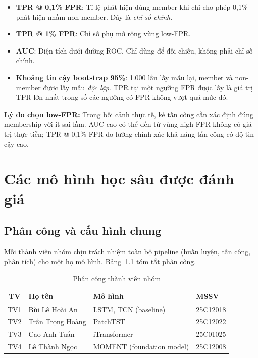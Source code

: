 \documentclass[12pt,a4paper]{report}
\begin{document}
\begin{itemize}
  \item \textbf{TPR @ 0,1\% FPR}: Tỉ lệ phát hiện đúng member khi chỉ cho phép 0,1\% phát hiện nhầm non-member. Đây là \textit{chỉ số chính}.
  \item \textbf{TPR @ 1\% FPR}: Chỉ số phụ mở rộng vùng low-FPR.
  \item \textbf{AUC}: Diện tích dưới đường ROC. Chỉ dùng để đối chiếu, không phải chỉ số chính.
  \item \textbf{Khoảng tin cậy bootstrap 95\%}: 1.000 lần lấy mẫu lại, member và non-member được lấy mẫu \textit{độc lập}. TPR tại một ngưỡng FPR được lấy là giá trị TPR lớn nhất trong số các ngưỡng có FPR không vượt quá mức đó.
\end{itemize}

\textbf{Lý do chọn low-FPR:} Trong bối cảnh thực tế, kẻ tấn công cần xác định đúng membership với ít sai lầm. AUC cao có thể đến từ vùng high-FPR không có giá trị thực tiễn; TPR @ 0,1\% FPR đo lường chính xác khả năng tấn công có độ tin cậy cao.

\chapter{Các mô hình học sâu được đánh giá}
\label{chap:models}

\section{Phân công và cấu hình chung}

Mỗi thành viên nhóm chịu trách nhiệm toàn bộ pipeline (huấn luyện, tấn công, phân tích) cho một họ mô hình. Bảng~\ref{tab:phancon} tóm tắt phân công.

\begin{table}[H]
\centering
\caption{Phân công thành viên nhóm}
\label{tab:phancon}
\begin{tabular}{clll}
\toprule
\textbf{TV} & \textbf{Họ tên} & \textbf{Mô hình} & \textbf{MSSV} \\
\midrule
TV1 & Bùi Lê Hoài An   & LSTM, TCN (baseline)       & 25C12018 \\
TV2 & Trần Trọng Hoàng & PatchTST                   & 25C12022 \\
TV3 & Cao Anh Tuấn     & iTransformer               & 25C01025 \\
TV4 & Lê Thành Ngọc    & MOMENT (foundation model)  & 25C12008 \\
\bottomrule
\end{tabular}
\end{table}
\end{document}

